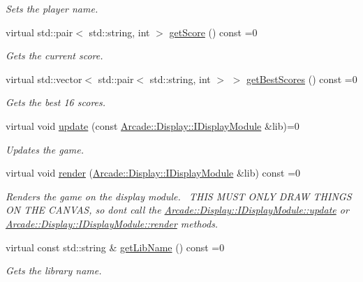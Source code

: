 \begin{DoxyCompactItemize}
\begin{DoxyCompactList}\small\item\em Sets the player name. \end{DoxyCompactList}\item 
virtual std\+::pair$<$ std\+::string, int $>$ \mbox{\hyperlink{classArcade_1_1Games_1_1IGameModule_ad84a0b04bb998a4eb3682c76d0fababf}{get\+Score}} () const =0
\begin{DoxyCompactList}\small\item\em Gets the current score. \end{DoxyCompactList}\item 
virtual std\+::vector$<$ std\+::pair$<$ std\+::string, int $>$ $>$ \mbox{\hyperlink{classArcade_1_1Games_1_1IGameModule_afaec4931b0051ba589fbe1b14d20131b}{get\+Best\+Scores}} () const =0
\begin{DoxyCompactList}\small\item\em Gets the best 16 scores. \end{DoxyCompactList}\item 
virtual void \mbox{\hyperlink{classArcade_1_1Games_1_1IGameModule_a421d1064fcc112dfc7ea025fc7f88aa7}{update}} (const \mbox{\hyperlink{classArcade_1_1Display_1_1IDisplayModule}{Arcade\+::\+Display\+::\+I\+Display\+Module}} \&lib)=0
\begin{DoxyCompactList}\small\item\em Updates the game. \end{DoxyCompactList}\item 
virtual void \mbox{\hyperlink{classArcade_1_1Games_1_1IGameModule_afd5ec66681e77038e3d4dc17f43e1ee9}{render}} (\mbox{\hyperlink{classArcade_1_1Display_1_1IDisplayModule}{Arcade\+::\+Display\+::\+I\+Display\+Module}} \&lib) const =0
\begin{DoxyCompactList}\small\item\em Renders the game on the display module.~\newline
T\+H\+IS M\+U\+ST O\+N\+LY D\+R\+AW T\+H\+I\+N\+GS ON T\+HE C\+A\+N\+V\+AS, so don\textquotesingle{}t call the \mbox{\hyperlink{classArcade_1_1Display_1_1IDisplayModule_a1ca0c1052dccb78eb470e36e6f557e60}{Arcade\+::\+Display\+::\+I\+Display\+Module\+::update}} or \mbox{\hyperlink{classArcade_1_1Display_1_1IDisplayModule_a012f5804e7dc45515ef8e85e7ca8de5a}{Arcade\+::\+Display\+::\+I\+Display\+Module\+::render}} methods. \end{DoxyCompactList}\item 
virtual const std\+::string \& \mbox{\hyperlink{classArcade_1_1Games_1_1IGameModule_a30966cbaa00abbd2a211cf152ea595f2}{get\+Lib\+Name}} () const =0
\begin{DoxyCompactList}\small\item\em Gets the library name. \end{DoxyCompactList}\end{DoxyCompactItemize}


